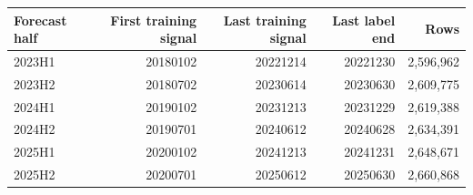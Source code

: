 \begin{tabular}{lrrrr}
\toprule
Forecast half & First training signal & Last training signal & Last label end & Rows \\
\midrule
2023H1 & 20180102 & 20221214 & 20221230 & 2,596,962 \\
2023H2 & 20180702 & 20230614 & 20230630 & 2,609,775 \\
2024H1 & 20190102 & 20231213 & 20231229 & 2,619,388 \\
2024H2 & 20190701 & 20240612 & 20240628 & 2,634,391 \\
2025H1 & 20200102 & 20241213 & 20241231 & 2,648,671 \\
2025H2 & 20200701 & 20250612 & 20250630 & 2,660,868 \\
\bottomrule
\end{tabular}
